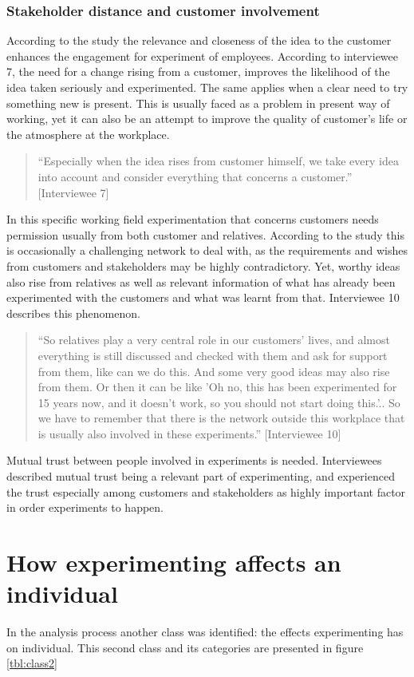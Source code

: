 \subsubsection{Stakeholder distance and customer involvement}
According to the study the relevance and closeness of the idea to the customer enhances the engagement for experiment of employees. According to interviewee 7, the need for a change rising from a customer, improves the likelihood of the idea taken seriously and experimented. The same applies when a clear need to try something new is present. This is usually faced as a problem in present way of working, yet it can also be an attempt to improve the quality of customer's life or the atmosphere at the workplace.  
\begin{quote}
 ``Especially when the idea rises from customer himself, we take every idea into account and consider everything that concerns a customer.'' [Interviewee 7]
\end{quote}
In this specific working field experimentation that concerns customers needs permission usually from both customer and relatives. According to the study this is occasionally a challenging network to deal with, as the requirements and wishes from customers and stakeholders may be highly contradictory. Yet, worthy ideas also rise from relatives as well as relevant information of what has already been experimented with the customers and what was learnt from that. Interviewee 10 describes this phenomenon. 
\begin{quote}
``So relatives play a very central role in our customers' lives, and almost everything is still discussed and checked with them and ask for support from them, like can we do this. And some very good ideas may also rise from them. Or then it can be like 'Oh no, this has been experimented for 15 years now, and it doesn't work, so you should not start doing this.'.. So we have to remember that there is the network outside this workplace that is usually also involved in these experiments.'' [Interviewee 10]
\end{quote}
Mutual trust between people involved in experiments is needed. Interviewees described mutual trust being a relevant part of experimenting, and experienced the trust especially among customers and stakeholders as highly important factor in order experiments to happen. 

\section{How experimenting affects an individual}
In the analysis process another class was identified: the effects experimenting has on individual. This second class and its categories are presented in figure \ref{tbl:class2}

